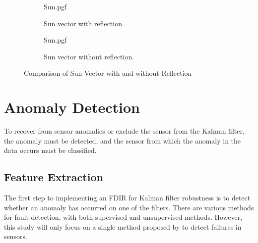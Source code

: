 \documentclass[letterpaper, 10 pt, conference]{ieeeconf}  %
\begin{document}
\begin{figure}[!htb]
	\begin{subfigure}{.5\textwidth}
		\centering
		{Sun.pgf}
		\caption[Sun vector with reflection]{Sun vector with reflection.}
		\label{fig:Sun Vector comparison with reflection}
	\end{subfigure}
	\begin{subfigure}{.5\textwidth}
		\centering
		{Sun.pgf} 
		\caption[Sun vector without reflection]{Sun vector without reflection.}
		\label{fig:Sun Vector comparison without reflection}
	\end{subfigure}
	
	\caption{Comparison of Sun Vector with and without Reflection}
	\label{fig:Sun Vector comparison}
	
\end{figure}


\section{Anomaly Detection}
To recover from sensor anomalies or exclude the sensor from the Kalman filter, the anomaly must be detected, and the sensor from which the anomaly in the data occurs must be classified.

\subsection{Feature Extraction}
The first step to implementing an FDIR for Kalman filter robustness is to detect whether an anomaly has occurred on one of the filters. There are various methods for fault detection, with both supervised and unsupervised methods. However, this study will only focus on a single method proposed by \textcite{DeSilva2020} to detect failures in sensors.
\end{document}
